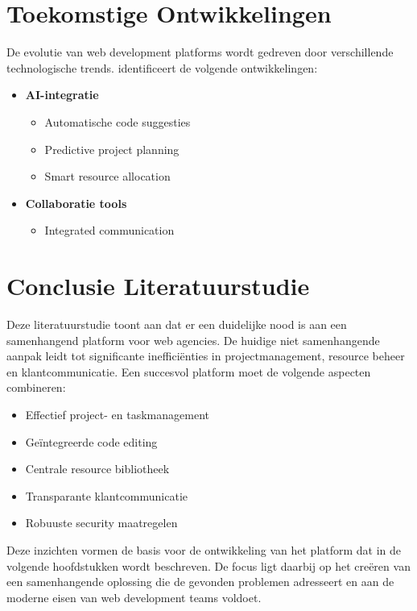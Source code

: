\section{Toekomstige Ontwikkelingen}
\label{sec:toekomst}

De evolutie van web development platforms wordt gedreven door verschillende technologische trends. \textcite{Chen2024a} identificeert de volgende ontwikkelingen:

\begin{itemize}
    \item \textbf{AI-integratie}
    \begin{itemize}
        \item Automatische code suggesties
        \item Predictive project planning
        \item Smart resource allocation
    \end{itemize}
    
    
    \item \textbf{Collaboratie tools}
    \begin{itemize}
        \item Integrated communication
    \end{itemize}
\end{itemize}

\section{Conclusie Literatuurstudie}
\label{sec:conclusie}

Deze literatuurstudie toont aan dat er een duidelijke nood is aan een samenhangend platform voor web agencies. De huidige niet samenhangende aanpak leidt tot significante inefficiënties in projectmanagement, resource beheer en klantcommunicatie. Een succesvol platform moet de volgende aspecten combineren:

\begin{itemize}
    \item Effectief project- en taskmanagement
    \item Geïntegreerde code editing
    \item Centrale resource bibliotheek
    \item Transparante klantcommunicatie
    \item Robuuste security maatregelen
\end{itemize}

Deze inzichten vormen de basis voor de ontwikkeling van het platform dat in de volgende hoofdstukken wordt beschreven. De focus ligt daarbij op het creëren van een samenhangende oplossing die de gevonden problemen adresseert en aan de moderne eisen van web development teams voldoet.

